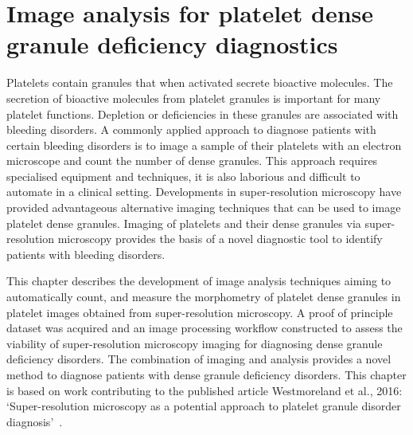 \chapter{Image analysis for platelet dense granule deficiency diagnostics}
\label{platelets}
\ifpdf
    \graphicspath{{chapter_3/figs/}}
\fi


Platelets contain granules that when activated secrete bioactive molecules. The secretion of bioactive molecules from platelet granules is important for many platelet functions. Depletion or deficiencies in these granules are associated with bleeding disorders. A commonly applied approach to diagnose patients with certain bleeding disorders is to image a sample of their platelets with an electron microscope and count the number of dense granules. This approach requires specialised equipment and techniques, it is also laborious and difficult to automate in a clinical setting. Developments in super-resolution microscopy have provided advantageous alternative imaging techniques that can be used to image platelet dense granules. Imaging of platelets and their dense granules via super-resolution microscopy provides the basis of a novel diagnostic tool to identify patients with bleeding disorders.

This chapter describes the development of image analysis techniques aiming to automatically count, and measure the morphometry of platelet dense granules in platelet images obtained from super-resolution microscopy. A proof of principle dataset was acquired and an image processing workflow constructed to assess the viability of super-resolution microscopy imaging for diagnosing dense granule deficiency disorders. The combination of imaging and analysis provides a novel method to diagnose patients with dense granule deficiency disorders. This chapter is based on work contributing to the published article Westmoreland et al., 2016: `Super-resolution microscopy as a potential approach to platelet granule disorder diagnosis'~\cite{Westmoreland2016}.

